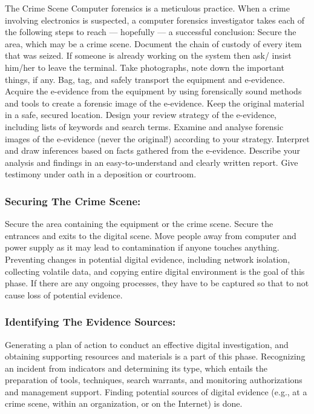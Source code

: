 \documentclass[british]{article}
\begin{document}
The Crime Scene Computer forensics is a meticulous practice. When
a crime involving electronics is suspected, a computer forensics investigator
takes each of the following steps to reach --- hopefully --- a successful
conclusion: Secure the area, which may be a crime scene. Document
the chain of custody of every item that was seized. If someone is
already working on the system then ask/ insist him/her to leave the
terminal. Take photographs, note down the important things, if any.
Bag, tag, and safely transport the equipment and e-evidence. Acquire
the e-evidence from the equipment by using forensically sound methods
and tools to create a forensic image of the e-evidence. Keep the original
material in a safe, secured location. Design your review strategy
of the e-evidence, including lists of keywords and search terms. Examine
and analyse forensic images of the e-evidence (never the original!)
according to your strategy. Interpret and draw inferences based on
facts gathered from the e-evidence. Describe your analysis and findings
in an easy-to-understand and clearly written report. Give testimony
under oath in a deposition or courtroom.

\subsubsection{Securing The Crime Scene:}

Secure the area containing the equipment or the crime scene. Secure
the entrances and exits to the digital scene. Move people away from
computer and power supply as it may lead to contamination if anyone
touches anything. Preventing changes in potential digital evidence,
including network isolation, collecting volatile data, and copying
entire digital environment is the goal of this phase. If there are
any ongoing processes, they have to be captured so that to not cause
loss of potential evidence.

\subsubsection{Identifying The Evidence Sources:}

Generating a plan of action to conduct an effective digital investigation,
and obtaining supporting resources and materials is a part of this
phase. Recognizing an incident from indicators and determining its
type, which entails the preparation of tools, techniques, search warrants,
and monitoring authorizations and management support. Finding potential
sources of digital evidence (e.g., at a crime scene, within an organization,
or on the Internet) is done.
\end{document}
